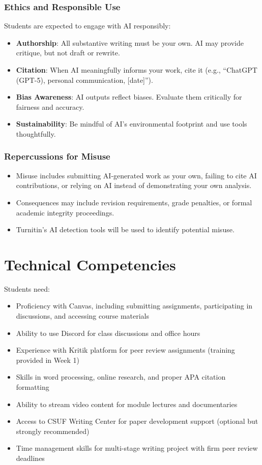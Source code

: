 \documentclass[12pt]{article}     %
\begin{document}
\subsubsection*{Ethics and Responsible Use}

\noindent Students are expected to engage with AI responsibly:

\begin{itemize}
    \item \textbf{Authorship}: All substantive writing must be your own. AI may provide critique, but not draft or rewrite.
    \item \textbf{Citation}: When AI meaningfully informs your work, cite it (e.g., ``ChatGPT (GPT-5), personal communication, [date]'').
    \item \textbf{Bias Awareness}: AI outputs reflect biases. Evaluate them critically for fairness and accuracy.
    \item \textbf{Sustainability}: Be mindful of AI's environmental footprint and use tools thoughtfully.
\end{itemize}

\subsubsection*{Repercussions for Misuse}

\begin{itemize}
    \item Misuse includes submitting AI-generated work as your own, failing to cite AI contributions, or relying on AI instead of demonstrating your own analysis.
    \item Consequences may include revision requirements, grade penalties, or formal academic integrity proceedings.
    \item Turnitin's AI detection tools will be used to identify potential misuse.
\end{itemize}

\section{Technical Competencies}
Students need:
\begin{itemize}
\item Proficiency with Canvas, including submitting assignments, participating in discussions, and accessing course materials
\item Ability to use Discord for class discussions and office hours
\item Experience with Kritik platform for peer review assignments (training provided in Week 1)
\item Skills in word processing, online research, and proper APA citation formatting
\item Ability to stream video content for module lectures and documentaries
\item Access to CSUF Writing Center for paper development support (optional but strongly recommended)
\item Time management skills for multi-stage writing project with firm peer review deadlines
\end{itemize}
\end{document}
